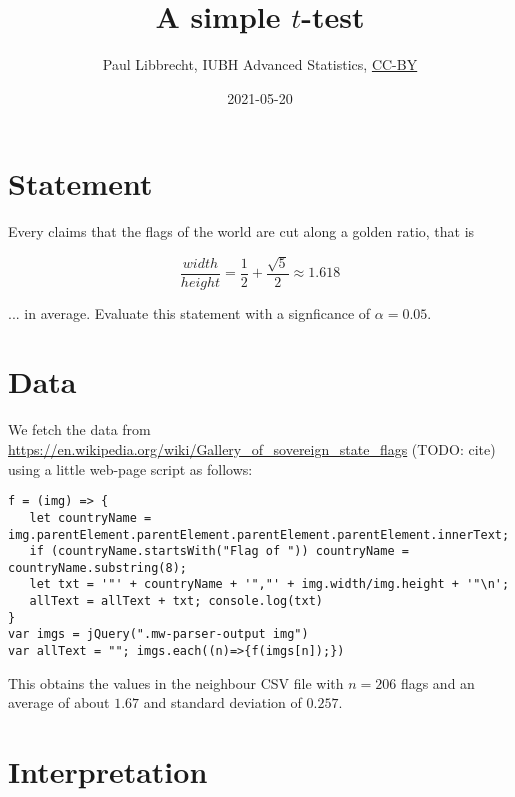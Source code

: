 \documentclass{article}
\begin{document}
\title{A simple $t$-test}
\date{2021-05-20}

\author{Paul Libbrecht, IUBH Advanced Statistics, \href{https://creativecommons.org/licenses/by/4.0/}{CC-BY}}
\maketitle




\section{Statement}

Every claims that the flags of the world are cut along a golden ratio, that is 

$$ \frac{width}{height} = \frac{1}{2} + \frac{\sqrt{5}}{2} \approx 1.618$$

... in average. Evaluate this statement with a signficance of $\alpha = 0.05$.


\section{Data}

We fetch the data from \url{https://en.wikipedia.org/wiki/Gallery_of_sovereign_state_flags} (TODO: cite) using a little web-page 
script as follows:

\begin{verbatim}
f = (img) => { 
   let countryName = img.parentElement.parentElement.parentElement.parentElement.innerText; 
   if (countryName.startsWith("Flag of ")) countryName = countryName.substring(8); 
   let txt = '"' + countryName + '","' + img.width/img.height + '"\n'; 
   allText = allText + txt; console.log(txt)
}
var imgs = jQuery(".mw-parser-output img")
var allText = ""; imgs.each((n)=>{f(imgs[n]);})
\end{verbatim}

This obtains the values in the neighbour CSV file with $n=206$ flags and an average of about $1.67$ and standard deviation 
of $0.257$.


\section{Interpretation}
\end{document}

